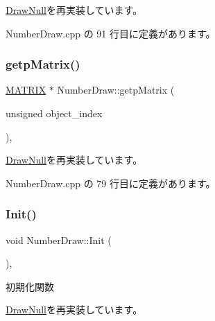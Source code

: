 \mbox{\hyperlink{class_draw_null_aa07d7e89e723b68ec257da0f63d43f70}{Draw\+Null}}を再実装しています。



 Number\+Draw.\+cpp の 91 行目に定義があります。

\mbox{\label{class_number_draw_a2ea44b362c3a018faf46905d0f755410}} 
\subsubsection{\texorpdfstring{getp\+Matrix()}{getpMatrix()}}
{\footnotesize\ttfamily \mbox{\hyperlink{_vector3_d_8h_a032295cd9fb1b711757c90667278e744}{M\+A\+T\+R\+IX}} $\ast$ Number\+Draw\+::getp\+Matrix (\begin{DoxyParamCaption}\item[{unsigned}]{object\+\_\+index }\end{DoxyParamCaption})\hspace{0.3cm}{\ttfamily [override]}, {\ttfamily [virtual]}}



\mbox{\hyperlink{class_draw_null_a001901c340671106a33d44b9d4aef4c4}{Draw\+Null}}を再実装しています。



 Number\+Draw.\+cpp の 79 行目に定義があります。

\mbox{\label{class_number_draw_ad52c1e8b9ae6e830a82c440cc18cb6c9}} 
\subsubsection{\texorpdfstring{Init()}{Init()}}
{\footnotesize\ttfamily void Number\+Draw\+::\+Init (\begin{DoxyParamCaption}{ }\end{DoxyParamCaption})\hspace{0.3cm}{\ttfamily [override]}, {\ttfamily [virtual]}}



初期化関数 



\mbox{\hyperlink{class_draw_null_acd7fef3ccea1da537ac9507ffbb6dd2e}{Draw\+Null}}を再実装しています。



